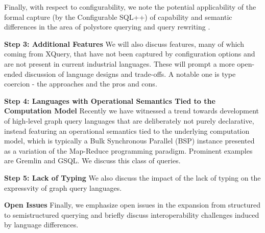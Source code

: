 Finally, with respect to configurability, we note the potential applicability of the formal capture (by the Configurable SQL++) of capability and semantic differences in the area of polystore querying and query rewriting \cite{DugganESBHKMMMZ15}.

\noindent \textbf{Step 3: Additional Features} We will also discuss features, many of which coming from XQuery, that have not been captured by configuration options and are not present in current industrial languages.  These will prompt a more open-ended discussion of language designs and trade-offs. A notable one is type coercion - the approaches and the pros and cons.

\noindent \textbf{Step 4: Languages with Operational Semantics Tied to the Computation Model}
Recently we have witnessed a trend towards development of high-level graph query languages that are deliberately not purely declarative, instead featuring an operational semantics tied to the
underlying computation model, which is typically a Bulk Synchronous Parallel (BSP) instance presented as a variation of the  Map-Reduce programming paradigm.
Prominent examples are Gremlin and GSQL. We discuss this class of queries.

\noindent \textbf{Step 5: Lack of Typing}
We also discuss the impact of the lack of typing on the expressvity of graph query languages.


\noindent \textbf{Open Issues} Finally, we emphasize open issues in the expansion from structured to semistructured querying and briefly discuss interoperability challenges induced by language differences.

